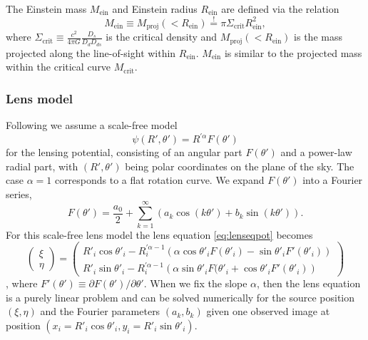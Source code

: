 \documentclass[useAMS,usenatbib]{mnras}
\begin{document}
The Einstein mass $M_\text{ein}$ and Einstein radius $R_\text{ein}$ are defined via the relation
\begin{equation*}
M_\text{ein} \equiv M_\text{proj}(<R_\text{ein}) \overset{!}{=} \pi \Sigma_\text{crit} R_\text{ein}^2,
\end{equation*}
where $\Sigma_\text{crit} \equiv \frac{c^2}{4\pi G} \frac{D_s}{D_d D_{ds}}$ is the critical density and $M_\text{proj}(<R_\text{ein})$ is the mass projected along the line-of-sight within $R_\text{ein}$. $M_\text{ein}$ is similar to the projected mass within the critical curve $M_\text{crit}$.

\subsubsection{Lens model} 

Following \citet{EvansWitt} we assume a scale-free model
\begin{equation}
\psi(R',\theta') = R^{'\alpha} F(\theta') \label{eq:scalefreemodel}
\end{equation}
for the lensing potential, consisting of an angular part $F(\theta')$ and a power-law radial part, with $(R',\theta')$ being polar coordinates on the plane of the sky. The case $\alpha = 1$ corresponds to a flat rotation curve. We expand $F(\theta')$ into a Fourier series,
\begin{equation}
F(\theta') = \frac{a_0}{2} + \sum_{k=1}^{\infty} \left(a_k \cos(k\theta') + b_k \sin (k\theta') \right). \label{eq:Fourieransatz}
\end{equation}
For this scale-free lens model the lens equation \eqref{eq:lenseqpot} becomes
\begin{equation}
\begin{pmatrix} \xi \\ \eta \end{pmatrix} = \begin{pmatrix} R'_i \cos \theta'_i - R_i^{'\alpha-1} \left(\alpha \cos \theta'_i F(\theta'_i) - \sin \theta'_i F'(\theta'_i) \right) \\ R'_i \sin \theta'_i - R_i^{'\alpha-1} \left(\alpha \sin \theta'_i F(\theta'_i + \cos \theta'_i F'(\theta'_i) \right)\end{pmatrix}\label{eq:Fourierlenseq}
\end{equation}
\citep{EvansWitt}, where $F'(\theta') \equiv \partial F(\theta') / \partial \theta'$. When we fix the slope $\alpha$, then the lens equation is a purely linear problem and can be solved numerically for the source position $(\xi,\eta)$ and the Fourier parameters $(a_k,b_k)$ given one observed image at position $(x_i=R'_i \cos \theta'_i,y_i=R'_i \sin \theta'_i)$. 
\end{document}
